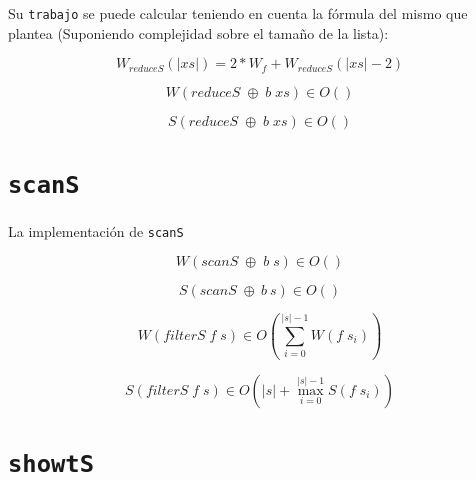\documentclass[a4paper,10pt]{article}
\begin{document}
    Su \texttt{trabajo} se puede calcular teniendo en cuenta la fórmula del
mismo que plantea (Suponiendo complejidad sobre el tamaño de la lista):

\begin{equation*}
    W_{reduceS} \left(\vert xs \vert \right) = 2 * W_f + W_{reduceS} \left( \vert xs \vert -2 \right)
\end{equation*}

\begin{equation*}
    W \left( reduceS\; \oplus \;b \;xs \right) \in
    O \left( \right)
\end{equation*}

\begin{equation*}
    S \left( reduceS\; \oplus \;b \;xs \right) \in
    O \left( \right)
\end{equation*}



\section*{\texttt{scanS}}

    La implementación de \texttt{scanS}

\begin{equation*}
    W \left( scanS\; \oplus \;b \;s \right) \in
    O \left( \right) 
\end{equation*}

\begin{equation*}
    S \left( scanS\; \oplus \:b \:s \right) \in
    O \left( \right)
\end{equation*}

\begin{equation*}
    W \left( filterS\; f \; s \right) \in
    O \left( \sum_{i=0}^{\vert s \vert -1} W \left( f \; s_i \right) \right)
\end{equation*}

\begin{equation*}
    S \left( filterS\; f \; s \right) \in
    O \left( \vert s \vert + \max_{i=0}^{\vert s \vert -1} S \left( f \; s_i \right) \right)
\end{equation*}


\section*{\texttt{showtS}}
\end{document}
